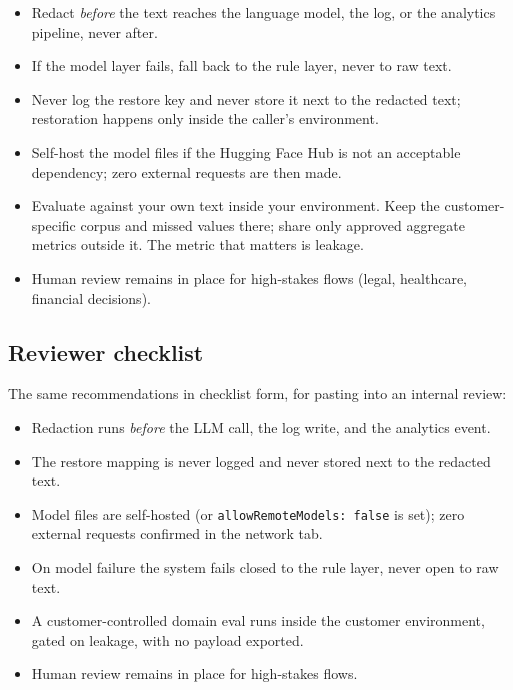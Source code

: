 \documentclass[10pt,a4paper]{article}
\newcommand{\pkg}[1]{\texttt{#1}}
\begin{document}
\begin{itemize}
  \item Redact \emph{before} the text reaches the language model, the log, or
        the analytics pipeline, never after.
  \item If the model layer fails, fall back to the rule layer, never to raw
        text.
  \item Never log the restore key and never store it next to the redacted
        text; restoration happens only inside the caller's environment.
  \item Self-host the model files if the Hugging Face Hub is not an
        acceptable dependency; zero external requests are then made.
  \item Evaluate against your own text inside your environment. Keep the
        customer-specific corpus and missed values there; share only approved
        aggregate metrics outside it. The metric that matters is leakage.
  \item Human review remains in place for high-stakes flows (legal,
        healthcare, financial decisions).
\end{itemize}

\subsection{Reviewer checklist}

The same recommendations in checklist form, for pasting into an internal
review:

\begin{itemize}
  \item[$\square$] Redaction runs \emph{before} the LLM call, the log write,
        and the analytics event.
  \item[$\square$] The restore mapping is never logged and never stored next
        to the redacted text.
  \item[$\square$] Model files are self-hosted (or \pkg{allowRemoteModels:
        false} is set); zero external requests confirmed in the network tab.
  \item[$\square$] On model failure the system fails closed to the rule
        layer, never open to raw text.
  \item[$\square$] A customer-controlled domain eval runs inside the customer
        environment, gated on leakage, with no payload exported.
  \item[$\square$] Human review remains in place for high-stakes flows.
\end{itemize}
\end{document}
